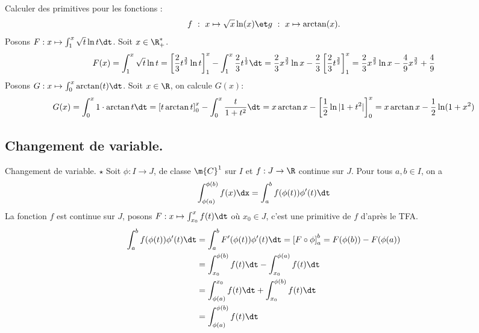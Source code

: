 \documentclass[11pt]{article}
\begin{document}
\begin{ex}{}{}
    Calculer des primitives pour les fonctions :
    \begin{equation*}
        f~:~x\mapsto\sqrt{x}\ln(x)\et g~:~x\mapsto\arctan(x).
    \end{equation*}
    \tcblower
    Posons $F:x\mapsto\int_1^x\sqrt{t}\ln t\dt$. Soit $x\in\R_+^*$.
    \begin{equation*}
        F(x)=\int_1^x\sqrt{t}\ln t=\left[ \frac{2}{3}t^{\frac{3}{2}}\ln t \right]_1^x-\int_1^x\frac{2}{3}t^{\frac{1}{2}}\dt=\frac{2}{3}x^{\frac{3}{2}}\ln x - \frac{2}{3}\left[ \frac{2}{3}t^{\frac{3}{2}} \right]_1^x=\frac{2}{3}x^{\frac{3}{2}}\ln x - \frac{4}{9}x^{\frac{3}{2}}+\frac{4}{9}
    \end{equation*}
    Posons $G:x\mapsto\int_0^x\arctan(t)\dt$. Soit $x\in\R$, on calcule $G(x)$:
    \begin{equation*}
        G(x)=\int_0^x1\cdot\arctan t\dt=\left[ t\arctan t \right]_0^x - \int_0^x\frac{t}{1+t^2}\dt=x\arctan x-\left[ \frac{1}{2}\ln|1+t^2| \right]_0^x=x\arctan x-\frac{1}{2}\ln(1+x^2)
    \end{equation*}
\end{ex}

\subsection{Changement de variable.}

\begin{thm}{Changement de variable. $\star$}{}
    Soit $\phi:I\to J$, de classe $\m{C}^1$ sur $I$ et $f:J\to\R$ continue sur $J$. Pour tous $a,b\in I$, on a
    \begin{equation*}
        \int_{\phi(a)}^{\phi(b)}f(x)\dx=\int_a^bf(\phi(t))\phi'(t)\dt
    \end{equation*}
    \tcblower
    La fonction $f$ est continue sur $J$, posons $F:x\mapsto\int_{x_0}^xf(t)\dt$ où $x_0\in J$, c'est une primitive de $f$ d'après le TFA.
    \begin{align*}
        \int_a^bf(\phi(t))\phi'(t)\dt&=\int_a^bF'(\phi(t))\phi'(t)\dt=\left[ F\circ\phi \right]_a^b=F(\phi(b))-F(\phi(a))\\
        &=\int_{x_0}^{\phi(b)}f(t)\dt-\int_{x_0}^{\phi(a)}f(t)\dt\\
        &=\int_{\phi(a)}^{x_0}f(t)\dt+\int_{x_0}^{\phi(b)}f(t)\dt\\
        &=\int_{\phi(a)}^{\phi(b)}f(t)\dt
    \end{align*}
\end{thm}
\end{document}
